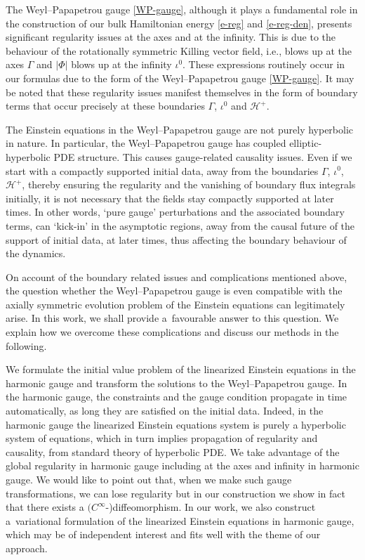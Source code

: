 The Weyl--Papapetrou gauge \eqref{WP-gauge}, although it plays a fundamental role in the construction of our bulk Hamiltonian energy \eqref{e-reg} and \eqref{e-reg-den}, presents significant regularity issues at the axes and at the infinity. This is due to the behaviour of the rotationally symmetric Killing vector field, i.e.,  blows up at the axes $\Gamma$ and $\vert \Phi \vert$ blows up at the infinity $\iota^0$. These expressions routinely occur in our formulas due to the form of the Weyl--Papapetrou gauge \eqref{WP-gauge}. It may be noted that these regularity issues manifest themselves in the form of boundary terms that occur precisely at these boundaries $\Gamma$, $\iota^0$ and $\mathcal{H}^+$.

The Einstein equations in the Weyl--Papapetrou gauge are not purely hyperbolic in nature. In particular, the Weyl--Papapetrou gauge has coupled elliptic-hyperbolic PDE structure. This causes gauge-related causality issues. Even if we start with a compactly supported initial data, away from the boundaries $\Gamma$, $\iota^0$, $\mathcal{H}^+$, thereby ensuring the regularity and the vanishing of boundary flux integrals initially, it is not necessary that the fields stay compactly supported at later times. In other words, `pure gauge' perturbations and the associated boundary terms, can `kick-in' in the asymptotic regions, away from the causal future of the support of initial data, at later times, thus affecting the boundary behaviour of the dynamics.



On account of the boundary related issues and complications mentioned above, the question whether the Weyl--Papapetrou gauge is even compatible with the axially symmetric evolution problem of the Einstein equations can legitimately arise. In this work, we shall provide a~favourable answer to this question. We explain how we overcome these complications and discuss our methods in the following.

We formulate the initial value problem of the linearized Einstein equations in the harmonic gauge and transform the solutions to the Weyl--Papapetrou gauge. In the harmonic gauge, the constraints and the gauge condition propagate in time automatically, as long they are satisfied on the initial data. Indeed, in the harmonic gauge the linearized Einstein equations system is purely a hyperbolic system of equations, which in turn implies propagation of regularity and causality, from standard theory of hyperbolic PDE. We take advantage of the global regularity in harmonic gauge including at the axes and infinity in harmonic gauge. We would like to point out that, when we make such gauge transformations, we can lose regularity but in our construction we show in fact that there exists a $(C^\infty$-)diffeomorphism.
 In our work, we also construct a~variational formulation of the linearized Einstein equations in harmonic gauge, which may be of independent interest and fits well with the theme of our approach.


